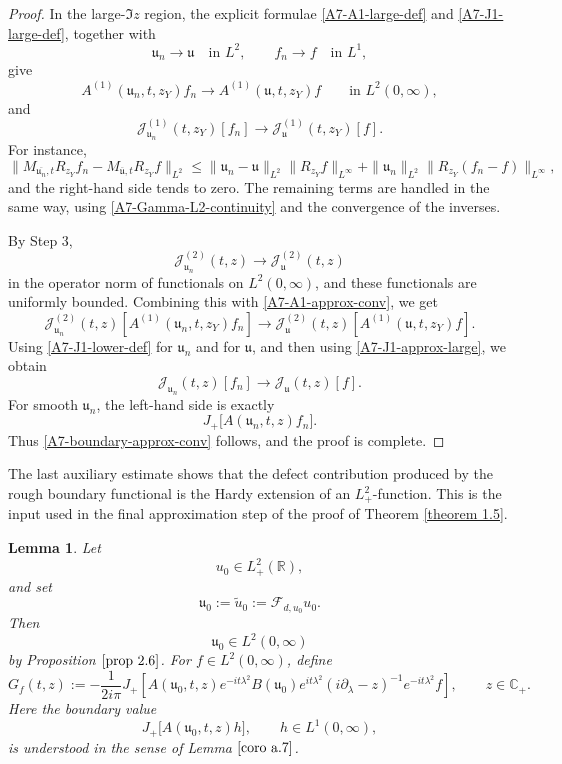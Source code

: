 \documentclass[10pt]{article}
\newtheorem{lemma}[theorem]{Lemma}
\numberwithin{equation}{section}
\numberwithin{theorem}{section}
\begin{document}
\begin{appendix}
\begin{proof}
In the large-\(\Im z\) region, the explicit formulae
\eqref{A7-A1-large-def} and \eqref{A7-J1-large-def}, together with
\[
\mathfrak u_n\to\mathfrak u
\quad\text{in }L^2,
\qquad
f_n\to f
\quad\text{in }L^1,
\]
give
\begin{equation}
\label{A7-A1-approx-conv}
A^{(1)}(\mathfrak u_n,t,z_Y)f_n
\longrightarrow
A^{(1)}(\mathfrak u,t,z_Y)f
\qquad\text{in }L^2(0,\infty),
\end{equation}
and
\begin{equation}
\label{A7-J1-approx-large}
\mathcal J^{(1)}_{\mathfrak u_n}(t,z_Y)[f_n]
\longrightarrow
\mathcal J^{(1)}_{\mathfrak u}(t,z_Y)[f].
\end{equation}
For instance,
\[
\|M_{\overline{\mathfrak u_n},t}R_{z_Y}f_n
-
M_{\overline{\mathfrak u},t}R_{z_Y}f\|_{L^2}
\le
\|\mathfrak u_n-\mathfrak u\|_{L^2}\|R_{z_Y}f\|_{L^\infty}
+
\|\mathfrak u_n\|_{L^2}\|R_{z_Y}(f_n-f)\|_{L^\infty},
\]
and the right-hand side tends to zero. The remaining terms are handled in the
same way, using \eqref{A7-Gamma-L2-continuity} and the convergence of the
inverses.

By Step 3,
\[
\mathcal J^{(2)}_{\mathfrak u_n}(t,z)
\to
\mathcal J^{(2)}_{\mathfrak u}(t,z)
\]
in the operator norm of functionals on \(L^2(0,\infty)\), and these functionals
are uniformly bounded. Combining this with \eqref{A7-A1-approx-conv}, we get
\[
\mathcal J^{(2)}_{\mathfrak u_n}(t,z)
\left[
A^{(1)}(\mathfrak u_n,t,z_Y)f_n
\right]
\to
\mathcal J^{(2)}_{\mathfrak u}(t,z)
\left[
A^{(1)}(\mathfrak u,t,z_Y)f
\right].
\]
Using \eqref{A7-J1-lower-def} for \(\mathfrak u_n\) and for \(\mathfrak u\), and
then using \eqref{A7-J1-approx-large}, we obtain
\[
\mathcal J_{\mathfrak u_n}(t,z)[f_n]
\to
\mathcal J_{\mathfrak u}(t,z)[f].
\]
For smooth \(\mathfrak u_n\), the left-hand side is exactly
\[
J_+\bigl[A(\mathfrak u_n,t,z)f_n\bigr].
\]
Thus \eqref{A7-boundary-approx-conv} follows, and the proof is complete.
\end{proof}

The last auxiliary estimate shows that the defect contribution produced by the rough
boundary functional is the Hardy extension of an \(L^2_+\)-function. This is the input
used in the final approximation step of the proof of Theorem \ref{theorem 1.5}.
\begin{lemma}
\label{lemma a.8}
Let
\[
u_0\in L^2_+(\mathbb R),
\]
and set
\[
\mathfrak u_0:=\widetilde u_0:=\mathcal F_{d,u_0}u_0 .
\]
Then
\[
\mathfrak u_0\in L^2(0,\infty)
\]
by Proposition \(\ref{prop 2.6}\). For \(f\in L^2(0,\infty)\), define
\begin{equation}
\label{A.8.1}
G_f(t,z)
:=
-\frac{1}{2i\pi}
J_+\left[
A(\mathfrak u_0,t,z)
e^{-it\lambda^2}
B(\mathfrak u_0)
e^{it\lambda^2}
(i\partial_\lambda-z)^{-1}
e^{-it\lambda^2}f
\right],
\qquad z\in\mathbb C_+ .
\end{equation}
Here the boundary value
\[
J_+\bigl[A(\mathfrak u_0,t,z)h\bigr],
\qquad h\in L^1(0,\infty),
\]
is understood in the sense of Lemma \(\ref{coro a.7}\).


\end{lemma}
\end{appendix}
\end{document}
